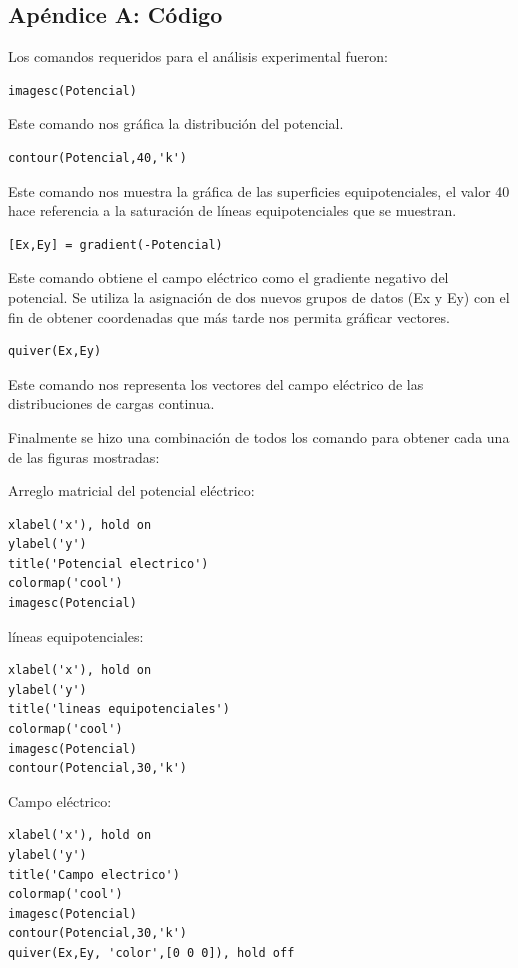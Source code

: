 \documentclass[letterpaper, 11 pt]{article}
\begin{document}
\begin{multicols}{2}
\nocite{*}





\section*{Apéndice A: Código}

Los comandos requeridos para el análisis experimental fueron:

\begin{lstlisting}
imagesc(Potencial) \end{lstlisting} Este comando nos gráfica la distribución del potencial.
\begin{lstlisting}
contour(Potencial,40,'k') \end{lstlisting}  Este comando nos muestra la gráfica de las superficies equipotenciales, el valor 40 hace referencia a la saturación de líneas equipotenciales que se muestran.
\begin{lstlisting}
[Ex,Ey] = gradient(-Potencial) \end{lstlisting} Este comando obtiene el campo eléctrico como el gradiente negativo del potencial. Se utiliza la asignación de dos nuevos grupos de datos (Ex y Ey) con el fin de obtener coordenadas que más tarde nos permita gráficar vectores.
\begin{lstlisting}
quiver(Ex,Ey) \end{lstlisting}  Este comando nos representa los vectores del campo eléctrico de las distribuciones de cargas continua.


Finalmente se hizo una combinación de todos los comando para obtener cada una de las figuras mostradas:

Arreglo matricial del potencial eléctrico:
\begin{lstlisting}
xlabel('x'), hold on
ylabel('y')
title('Potencial electrico')
colormap('cool')
imagesc(Potencial)
\end{lstlisting}

líneas equipotenciales:
\begin{lstlisting}
xlabel('x'), hold on
ylabel('y')
title('lineas equipotenciales')
colormap('cool')
imagesc(Potencial)
contour(Potencial,30,'k')
\end{lstlisting}

Campo eléctrico:
\begin{lstlisting}
xlabel('x'), hold on
ylabel('y')
title('Campo electrico')
colormap('cool')
imagesc(Potencial)
contour(Potencial,30,'k')
quiver(Ex,Ey, 'color',[0 0 0]), hold off
\end{lstlisting}

\end{multicols}
\end{document}
